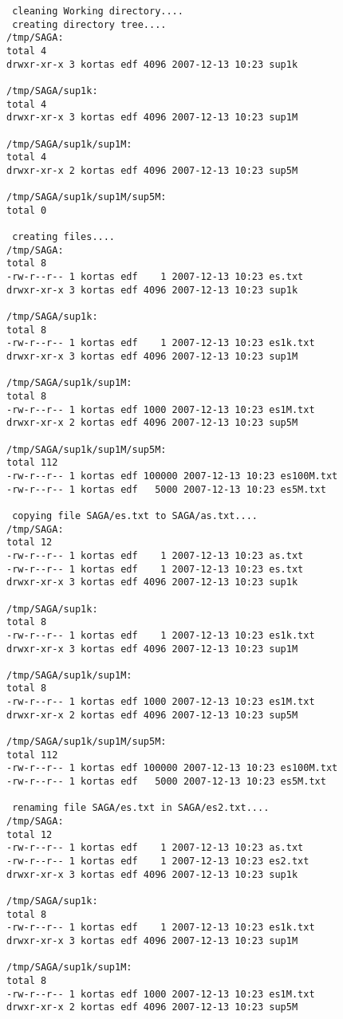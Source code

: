 \begin{small}
\begin{lstlisting}
 cleaning Working directory....
 creating directory tree....
/tmp/SAGA:
total 4
drwxr-xr-x 3 kortas edf 4096 2007-12-13 10:23 sup1k

/tmp/SAGA/sup1k:
total 4
drwxr-xr-x 3 kortas edf 4096 2007-12-13 10:23 sup1M

/tmp/SAGA/sup1k/sup1M:
total 4
drwxr-xr-x 2 kortas edf 4096 2007-12-13 10:23 sup5M

/tmp/SAGA/sup1k/sup1M/sup5M:
total 0

 creating files....
/tmp/SAGA:
total 8
-rw-r--r-- 1 kortas edf    1 2007-12-13 10:23 es.txt
drwxr-xr-x 3 kortas edf 4096 2007-12-13 10:23 sup1k

/tmp/SAGA/sup1k:
total 8
-rw-r--r-- 1 kortas edf    1 2007-12-13 10:23 es1k.txt
drwxr-xr-x 3 kortas edf 4096 2007-12-13 10:23 sup1M

/tmp/SAGA/sup1k/sup1M:
total 8
-rw-r--r-- 1 kortas edf 1000 2007-12-13 10:23 es1M.txt
drwxr-xr-x 2 kortas edf 4096 2007-12-13 10:23 sup5M

/tmp/SAGA/sup1k/sup1M/sup5M:
total 112
-rw-r--r-- 1 kortas edf 100000 2007-12-13 10:23 es100M.txt
-rw-r--r-- 1 kortas edf   5000 2007-12-13 10:23 es5M.txt

 copying file SAGA/es.txt to SAGA/as.txt....
/tmp/SAGA:
total 12
-rw-r--r-- 1 kortas edf    1 2007-12-13 10:23 as.txt
-rw-r--r-- 1 kortas edf    1 2007-12-13 10:23 es.txt
drwxr-xr-x 3 kortas edf 4096 2007-12-13 10:23 sup1k

/tmp/SAGA/sup1k:
total 8
-rw-r--r-- 1 kortas edf    1 2007-12-13 10:23 es1k.txt
drwxr-xr-x 3 kortas edf 4096 2007-12-13 10:23 sup1M

/tmp/SAGA/sup1k/sup1M:
total 8
-rw-r--r-- 1 kortas edf 1000 2007-12-13 10:23 es1M.txt
drwxr-xr-x 2 kortas edf 4096 2007-12-13 10:23 sup5M

/tmp/SAGA/sup1k/sup1M/sup5M:
total 112
-rw-r--r-- 1 kortas edf 100000 2007-12-13 10:23 es100M.txt
-rw-r--r-- 1 kortas edf   5000 2007-12-13 10:23 es5M.txt

 renaming file SAGA/es.txt in SAGA/es2.txt....
/tmp/SAGA:
total 12
-rw-r--r-- 1 kortas edf    1 2007-12-13 10:23 as.txt
-rw-r--r-- 1 kortas edf    1 2007-12-13 10:23 es2.txt
drwxr-xr-x 3 kortas edf 4096 2007-12-13 10:23 sup1k

/tmp/SAGA/sup1k:
total 8
-rw-r--r-- 1 kortas edf    1 2007-12-13 10:23 es1k.txt
drwxr-xr-x 3 kortas edf 4096 2007-12-13 10:23 sup1M

/tmp/SAGA/sup1k/sup1M:
total 8
-rw-r--r-- 1 kortas edf 1000 2007-12-13 10:23 es1M.txt
drwxr-xr-x 2 kortas edf 4096 2007-12-13 10:23 sup5M


\end{lstlisting}
\end{small}
